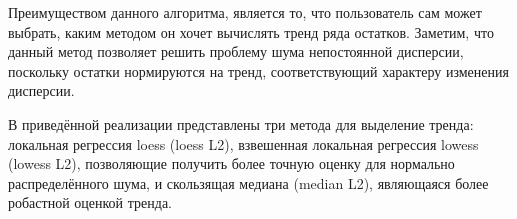 \documentclass[specialist,
               substylefile = spbu.rtx,
               subf,href,colorlinks=true, 12pt]{disser}
\begin{document}

\normalsize{Преимуществом данного алгоритма, является то, что пользователь сам может выбрать, каким методом он хочет вычислять тренд ряда остатков. Заметим, что данный метод позволяет решить проблему шума непостоянной дисперсии, поскольку остатки нормируются на тренд, соответствующий характеру изменения дисперсии. 
	
В приведённой реализации представлены три метода для выделение тренда: локальная регрессия loess (loess L2), взвешенная локальная регрессия lowess (lowess L2), позволяющие получить более точную оценку для нормально распределённого шума, и скользящая медиана (median L2), являющаяся более робастной оценкой тренда.}
\end{document}
